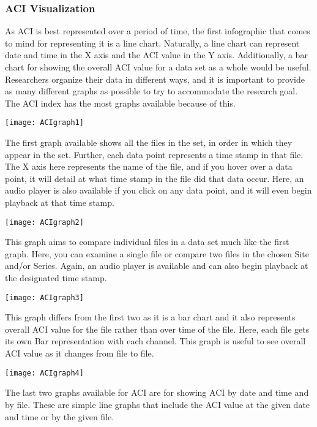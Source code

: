 \subsubsection{ACI Visualization}
As ACI is best represented over a period of time, the first infographic that comes to mind for representing it is a line chart. Naturally, a line chart can represent date and time in the X axis and the ACI value in the Y axis. Additionally, a bar chart for showing the overall ACI value for a data set as a whole would be useful. Researchers organize their data in different ways, and it is important to provide as many different graphs as possible to try to accommodate the research goal. The ACI index has the most graphs available because of this.\par

\begin{center}
  \texttt{[image: ACIgraph1]} \\[12pt]
\end{center}
The first graph available shows all the files in the set, in order in which they appear in the set. Further, each data point represents a time stamp in that file. The X axis here represents the name of the file, and if you hover over a data point, it will detail at what time stamp in the file did that data occur. Here, an audio player is also available if you click on any data point, and it will even begin playback at that time stamp.\par

\begin{center}
  \texttt{[image: ACIgraph2]} \\[12pt]
\end{center}
This graph aims to compare individual files in a data set much like the first graph. Here, you can examine a single file or compare two files in the chosen Site and/or Series. Again, an audio player is available and can also begin playback at the designated time stamp.\par

\begin{center}
  \texttt{[image: ACIgraph3]} \\[12pt]
\end{center}
This graph differs from the first two as it is a bar chart and it also represents overall ACI value for the file rather than over time of the file. Here, each file gets its own Bar representation with each channel. This graph is useful to see overall ACI value as it changes from file to file.\par

\begin{center}
  \texttt{[image: ACIgraph4]} \\[12pt]
\end{center}
The last two graphs available for ACI are for showing ACI by date and time and by file. These are simple line graphs that include the ACI value at the given date and time or by the given file.
